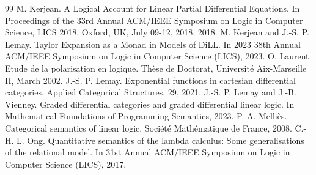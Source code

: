 \begin{thebibliography}{99}
 M. Kerjean. A Logical Account for Linear Partial Differential Equations. In Proceedings of the 33rd Annual ACM/IEEE Symposium on Logic in Computer Science, LICS 2018, Oxford, UK, July 09-12, 2018, 2018.
 M. Kerjean and J.-S. P. Lemay. Taylor Expansion as a Monad in Models of DiLL. In 2023 38th Annual ACM/IEEE Symposium on Logic in Computer Science (LICS), 2023.
 O. Laurent. Etude de la polarisation en logique. Thèse de Doctorat, Université Aix-Marseille II, March 2002.
 J.-S. P. Lemay. Exponential functions in cartesian differential categories. Applied Categorical Structures, 29, 2021.
 J.-S. P. Lemay and J.-B. Vienney. Graded differential categories and graded differential linear logic. In Mathematical Foundations of Programming Semantics, 2023.
 P.-A. Melliès. Categorical semantics of linear logic. Société Mathématique de France, 2008.
 C.-H. L. Ong. Quantitative semantics of the lambda calculus: Some generalisations of the relational model. In 31st Annual ACM/IEEE Symposium on Logic in Computer Science (LICS), 2017.
\end{thebibliography}
